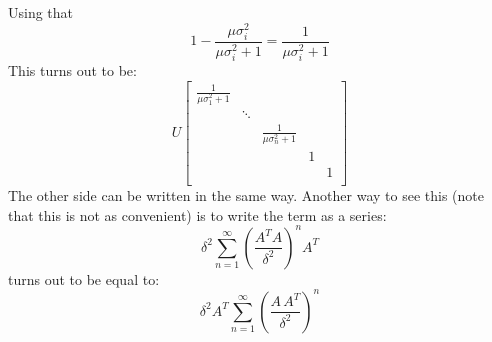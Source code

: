 Using that 
$$ 1- \frac{\mu \sigma_i^2}{\mu \sigma_i^2 +1} = \frac{1}{\mu\sigma_i^2 + 1}$$
This turns out to be:
\begin{equation*}
U\begin{bmatrix} \frac{1}{\mu\sigma_1^2 + 1} &        & & & \\
                                             & \ddots & & & \\
                                             & &\frac{1}{\mu\sigma_n^2 + 1}  & &\\
                                            &        &  &1& \\
                                            &        &  & &1 \\
\end{bmatrix}
\end{equation*}
The other side can be written in the same way. Another way to see this (note that this is not as convenient) is to write the term as a series:
$$\delta^2 \sum_{n=1}^\infty \left( \frac{A^T A}{\delta^2} \right)^n A^T $$
turns out to be equal to:
$$\delta^2 A^T \sum_{n=1}^\infty \left( \frac{A\, A^T}{\delta^2} \right)^n$$
